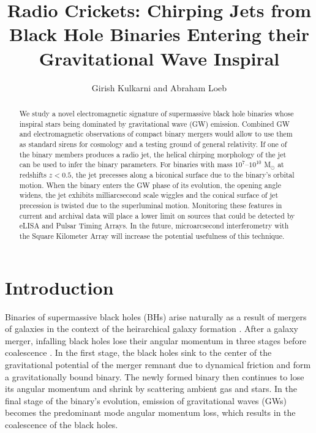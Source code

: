 \documentclass[iop]{emulateapj}
\begin{document}
\title{Radio Crickets: Chirping Jets from Black Hole Binaries Entering
  their Gravitational Wave Inspiral} \author{Girish
  Kulkarni and Abraham Loeb}
 

\begin{abstract}
We study a novel electromagnetic signature of supermassive black hole
binaries whose inspiral stars being dominated by gravitational wave
(GW) emission. Combined GW and electromagnetic observations of compact
binary mergers would allow to use them as standard sirens for
cosmology and a testing ground of general relativity.  If one of the
binary members produces a radio jet, the helical chirping morphology
of the jet can be used to infer the binary parameters.  For binaries
with mass $10^7$--$10^{10}$ M$_\odot$ at redshifts $z<0.5$, the jet
precesses along a biconical surface due to the binary's orbital
motion.  When the binary enters the GW phase of its evolution, the
opening angle widens, the jet exhibits milliarcsecond scale wiggles
and the conical surface of jet precession is twisted due to the
superluminal motion.  Monitoring these features in current and
archival data will place a lower limit on sources that could be
detected by eLISA and Pulsar Timing Arrays.  In the future,
microarcsecond interferometry with the Square Kilometer Array will
increase the potential usefulness of this technique.
\end{abstract}


\section{Introduction}
\label{sec:intro}

Binaries of supermassive black holes (BHs) arise naturally as a result
of mergers of galaxies in the context of the heirarchical galaxy
formation \citep{2000MNRAS.311..576K, 2002MNRAS.336L..61H,
  2008ApJ...676...33D, 2012MNRAS.422.1306K}.  After a galaxy merger,
infalling black holes lose their angular momentum in three stages
before coalescence \citep{1980Natur.287..307B, 2005LRR.....8....8M,
  2011ASL.....4..181C}.  In the first stage, the black holes sink to
the center of the gravitational potential of the merger remnant due to
dynamical friction and form a gravitationally bound binary.  The newly
formed binary then continues to lose its angular momentum and shrink
by scattering ambient gas and stars.  In the final stage of the
binary's evolution, emission of gravitational waves (GWs) becomes the
predominant mode angular momentum loss, which results in the
coalescence of the black holes.
\end{document}
